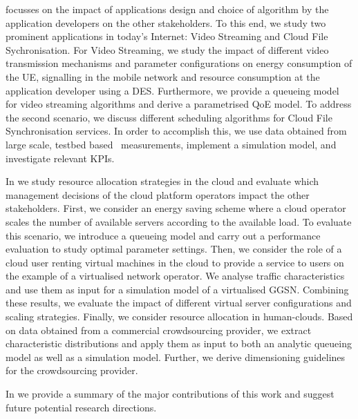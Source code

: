  focusses on the impact of applications design and choice of algorithm by the application developers on the other stakeholders.
To this end, we study two prominent applications in today's Internet: Video Streaming and Cloud File Sychronisation.
For Video Streaming, we study the impact of different video transmission mechanisms and parameter configurations on energy consumption of the \gls{UE}, signalling in the mobile network and resource consumption at the application developer using a \gls{DES}.
Furthermore, we provide a queueing model for video streaming algorithms and derive a parametrised \gls{QoE} model.
To address the second scenario, we discuss different scheduling algorithms for Cloud File Synchronisation services.
In order to accomplish this, we use data obtained from large scale, testbed based~\cite{Chun2003} measurements, implement a simulation model, and investigate relevant \glspl{KPI}.

In  we study resource allocation strategies in the cloud and evaluate which management decisions of the cloud platform operators impact the other stakeholders.
First, we consider an energy saving scheme where a cloud operator scales the number of available servers according to the available load.
To evaluate this scenario, we introduce a queueing model and carry out a performance evaluation to study optimal parameter settings.
Then, we consider the role of a cloud user renting virtual machines in the cloud to provide a service to users on the example of a virtualised network operator.
We analyse traffic characteristics and use them as input for a simulation model of a virtualised \gls{GGSN}.
Combining these results, we evaluate the impact of different virtual server configurations and scaling strategies.
Finally, we consider resource allocation in human-clouds.
Based on data obtained from a commercial crowdsourcing provider, we extract characteristic distributions and apply them as input to both an analytic queueing model as well as a simulation model. Further, we derive dimensioning guidelines for the crowdsourcing provider.

In  we provide a summary of the major contributions of this work and suggest future potential research directions.

